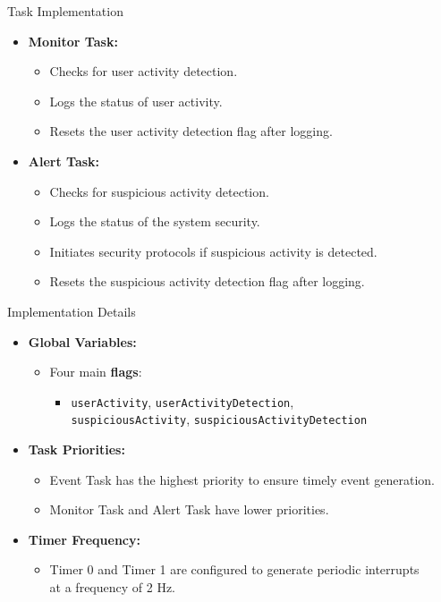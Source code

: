 \begin{frame}{Task Implementation}
    \begin{itemize}
        \item \textbf{Monitor Task:}
            \begin{itemize}
                \item Checks for user activity detection.
                \item Logs the status of user activity.
                \item Resets the user activity detection flag after logging.
            \end{itemize}
        \item \textbf{Alert Task:}
            \begin{itemize}
                \item Checks for suspicious activity detection.
                \item Logs the status of the system security.
                \item Initiates security protocols if suspicious activity is detected.
                \item Resets the suspicious activity detection flag after logging.
            \end{itemize}
    \end{itemize}
\end{frame}

\begin{frame}{Implementation Details}
    \begin{itemize}
        \item \textbf{Global Variables:}
            \begin{itemize}
                \item Four main \textbf{flags}:
                    \begin{itemize}
                        \item \texttt{userActivity}, \texttt{userActivityDetection}, \\ \texttt{suspiciousActivity}, \texttt{suspiciousActivityDetection}
                    \end{itemize}
            \end{itemize}
        \item \textbf{Task Priorities:}
            \begin{itemize}
                \item Event Task has the highest priority to ensure timely event generation.
                \item Monitor Task and Alert Task have lower priorities.
            \end{itemize}
        \item \textbf{Timer Frequency:}
            \begin{itemize}
                \item Timer 0 and Timer 1 are configured to generate periodic interrupts \\at a frequency of 2 Hz.
            \end{itemize}
    \end{itemize}
\end{frame}


